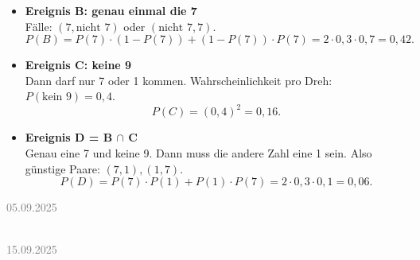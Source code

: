 \documentclass[11pt,a4paper,oneside]{article}
\newcommand{\lessondate}[1]{
	\noindent\hfill\textcolor{gray}{\textsc{#1}} \\
	\vspace{0.5cm}
}
\begin{document}
\begin{loesung}{}
\begin{itemize}
			\item \textbf{Ereignis B: genau einmal die 7}\\
			Fälle: \((7,\text{nicht 7})\) oder \((\text{nicht 7},7)\).  
			\[
			P(B)=P(7)\cdot(1-P(7))+ (1-P(7))\cdot P(7)=2\cdot 0{,}3\cdot 0{,}7=0{,}42.
			\]
			
			\item \textbf{Ereignis C: keine 9}\\
			Dann darf nur 7 oder 1 kommen. Wahrscheinlichkeit pro Dreh: \(P(\text{kein 9})=0{,}4\).  
			\[
			P(C)=(0{,}4)^2=0{,}16.
			\]
			
			\item \textbf{Ereignis D = B $\cap$ C}\\
			Genau eine 7 und keine 9.  
			Dann muss die andere Zahl eine 1 sein. Also günstige Paare: \((7,1),(1,7)\).  
			\[
			P(D)=P(7)\cdot P(1)+P(1)\cdot P(7)=2\cdot 0{,}3\cdot 0{,}1=0{,}06.
			\]
		\end{itemize}
	\end{loesung}
	
	\newpage
	
	
	\lessondate{05.09.2025}\\
	
	
	\newpage
	
	\lessondate{15.09.2025}\\
	
\end{document}

